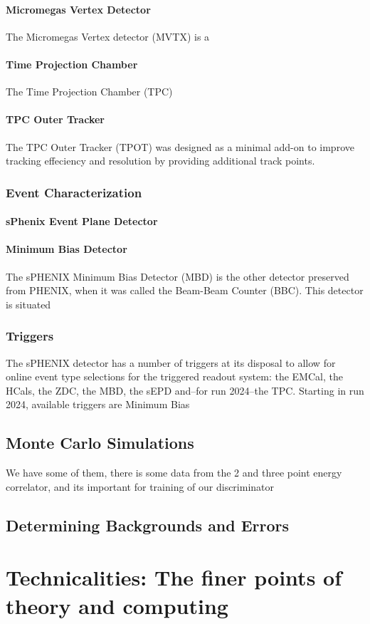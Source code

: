 \documentclass[letterpaper, 12pt, oneside]{book}
\theoremstyle{definition}
\begin{document}
	\subsection{Micromegas Vertex Detector}
	The Micromegas Vertex detector (MVTX) is a 
	\subsection{Time Projection Chamber}
	The Time Projection Chamber (TPC) 
	\subsection{TPC Outer Tracker}
	The TPC Outer Tracker (TPOT) was designed as a minimal add-on to improve tracking effeciency and resolution by providing additional track points. 
\section{Event Characterization}
	\subsection{sPhenix Event Plane Detector}
	\subsection{Minimum Bias Detector}
	The sPHENIX Minimum Bias Detector (MBD) is the other detector preserved from PHENIX, when it was called the Beam-Beam Counter (BBC). 
	This detector is situated  
\section{Triggers}
	The sPHENIX detector has a number of triggers at its disposal to allow for online event type selections for the triggered readout system: the EMCal, the HCals, the ZDC, the MBD, the sEPD and--for run 2024--the TPC.
	Starting in run 2024, available triggers are Minimum Bias 
\chapter{Monte Carlo Simulations}
	We have some of them, there is some data from the 2 and three point energy correlator, and its important for training of our discriminator 
\chapter{Determining Backgrounds and Errors}
\part{Technicalities: The finer points of theory and computing}
\end{document}
